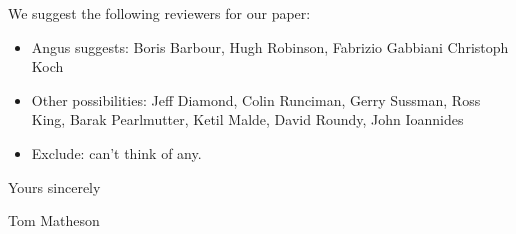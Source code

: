 \documentclass[11pt]{article}
\begin{document}
We suggest the following reviewers for our paper:

\begin{itemize}

\item Angus suggests: Boris Barbour, Hugh Robinson, Fabrizio Gabbiani
  Christoph Koch

\item Other possibilities: Jeff Diamond, Colin Runciman, Gerry
  Sussman, Ross King, Barak Pearlmutter, Ketil Malde, David Roundy,
  John Ioannides

\item Exclude: can't think of any. 

\end{itemize}

\noindent Yours sincerely

\noindent Tom Matheson
\end{document}
